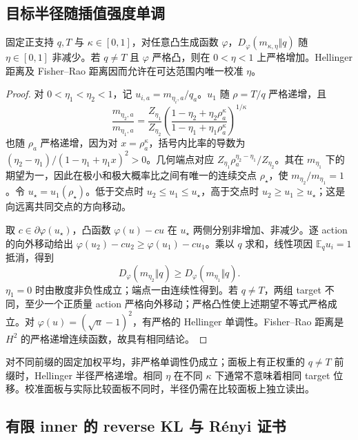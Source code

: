\documentclass[lang=cn,scheme=chinese,openany]{../book/elegantbook}
\newcommand{\E}{\mathbb E}
\begin{document}
\subsection{目标半径随插值强度单调}

\begin{theorem}[固定锚点的目标半径单调性]
\label{thm:power-target-radius}
固定正支持 $q,T$ 与 $\kappa\in[0,1]$，对任意凸生成函数 $\varphi$，$D_\varphi(m_{\kappa,\eta}\Vert q)$ 随 $\eta\in[0,1]$ 非减少。若 $q\ne T$ 且 $\varphi$ 严格凸，则在 $0<\eta<1$ 上严格增加。Hellinger 距离及 Fisher--Rao 距离因而允许在可达范围内唯一校准 $\eta$。
\end{theorem}

\begin{proof}
对 $0<\eta_1<\eta_2<1$，记 $u_{i,a}=m_{\eta_i,a}/q_a$。$u_1$ 随 $\rho=T/q$ 严格递增，且
\begin{equation}
 \frac{m_{\eta_2,a}}{m_{\eta_1,a}}
 =\frac{Z_{\eta_1}}{Z_{\eta_2}}
 \left(\frac{1-\eta_2+\eta_2\rho_a^\kappa}
 {1-\eta_1+\eta_1\rho_a^\kappa}\right)^{1/\kappa}
\end{equation}
也随 $\rho_a$ 严格递增，因为对 $x=\rho_a^\kappa$，括号内比率的导数为 $(\eta_2-\eta_1)/(1-\eta_1+\eta_1x)^2>0$。几何端点对应 $Z_{\eta_1}\rho_a^{\eta_2-\eta_1}/Z_{\eta_2}$。其在 $m_{\eta_1}$ 下的期望为一，因此在极小和极大概率比之间有唯一的连续交点 $\rho_\star$，使 $m_{\eta_2}/m_{\eta_1}=1$。令 $u_\star=u_1(\rho_\star)$。低于交点时 $u_2\le u_1\le u_\star$，高于交点时 $u_2\ge u_1\ge u_\star$；这是向远离共同交点的方向移动。

取 $c\in\partial\varphi(u_\star)$，凸函数 $\varphi(u)-cu$ 在 $u_\star$ 两侧分别非增加、非减少。逐 action 的向外移动给出 $\varphi(u_2)-cu_2\ge\varphi(u_1)-cu_1$。乘以 $q$ 求和，线性项因 $\E_qu_i=1$ 抵消，得到
\begin{equation}
 D_\varphi(m_{\eta_2}\Vert q)\ge D_\varphi(m_{\eta_1}\Vert q).
\end{equation}
$\eta_1=0$ 时由散度非负性成立；端点一由连续性得到。若 $q\ne T$，两组 target 不同，至少一个正质量 action 严格向外移动；严格凸性使上述期望不等式严格成立。对 $\varphi(u)=(\sqrt u-1)^2$，有严格的 Hellinger 单调性。Fisher--Rao 距离是 $H^2$ 的严格递增连续函数，故具有相同结论。
\end{proof}

对不同前缀的固定加权平均，非严格单调性仍成立；面板上有正权重的 $q\ne T$ 前缀时，Hellinger 半径严格递增。相同 $\eta$ 在不同 $\kappa$ 下通常不意味着相同 target 位移。校准面板与实际比较面板不同时，半径仍需在比较面板上独立读出。
\subsection{有限 inner 的 reverse KL 与 Rényi 证书}
\end{document}
